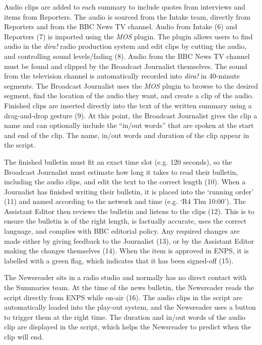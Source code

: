 Audio clips are added to each summary to include quotes from interviews and items from Reporters. The audio is sourced
from the Intake team, directly from Reporters and from the BBC News TV channel. Audio from Intake (6) and Reporters (7) is
imported using the \textit{MOS} plugin. The plugin allows users to find audio in the \textit{dira!} radio production
system and edit clips by cutting the audio, and controlling sound levels/fading (8).  Audio from the BBC News TV
channel must be found and clipped by the Broadcast Journalist themselves. The sound from the television channel is
automatically recorded into \textit{dira!} in 40-minute segments. The Broadcast Journalist uses the \textit{MOS} plugin
to browse to the desired segment, find the location of the audio they want, and create a clip of the audio.  Finished
clips are inserted directly into the text of the written summary using a drag-and-drop gesture (9). At this point, the
Broadcast Journalist gives the clip a name and can optionally include the ``in/out words'' that are spoken at the start
and end of the clip.  The name, in/out words and duration of the clip appear in the script.

The finished bulletin must fit an exact time slot (e.g. 120 seconds), so the Broadcast Journalist must estimate how
long it takes to read their bulletin, including the audio clips, and edit the text to the correct length (10).  When a
Journalist has finished writing their bulletin, it is placed into the `running order' (11) and named according to the
network and time (e.g. `R4 Thu 10:00').  The Assistant Editor then reviews the bulletin and listens to the clips (12). This
is to ensure the bulletin is of the right length, is factually accurate, uses the correct language, and complies with
BBC editorial policy. Any required changes are made either by giving feedback to the Journalist (13), or by the Assistant
Editor making the changes themselves (14).  When the item is approved in ENPS, it is labelled with a green flag, which
indicates that it has been signed-off (15).

The Newsreader sits in a radio studio and normally has no direct contact with the Summaries team.  At the time of the
news bulletin, the Newsreader reads the script directly from ENPS while on-air (16). The audio clips in the script are
automatically loaded into the play-out system, and the Newsreader uses a button to trigger them at the right time.  The
duration and in/out words of the audio clip are displayed in the script, which helps the Newsreader to predict when the
clip will end.

